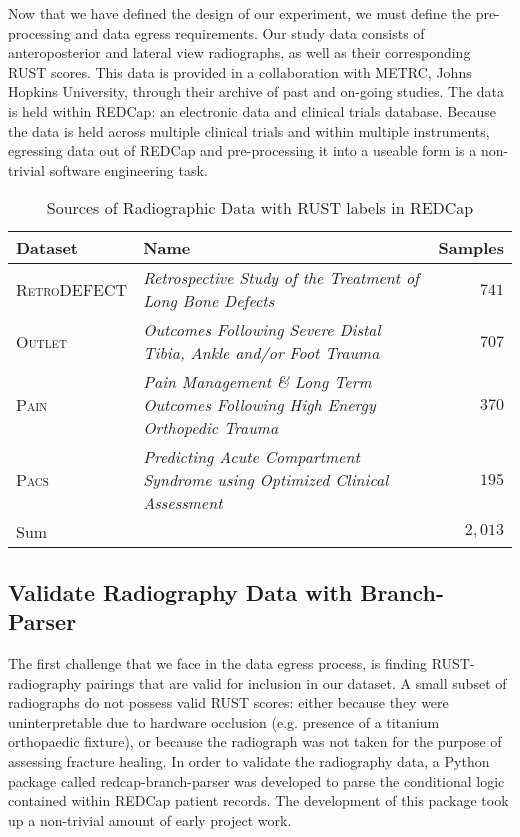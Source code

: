 Now that we have defined the design of our experiment, we must define the pre-processing and data egress requirements.
Our study data consists of anteroposterior and lateral view radiographs, as well as their corresponding RUST scores. This data is provided in a collaboration with METRC, Johns Hopkins University, through their archive of past and on-going studies. \autocites{RetroDEFECT2022}{OUTLET2021}{PAIN2017}{PACS2022} The data is held within REDCap: an electronic data and clinical trials database. \autocite{redcap} Because the data is held across multiple clinical trials and within multiple instruments, egressing data out of REDCap and pre-processing it into a useable form is a non-trivial software engineering task.

\begin{table}[H]
    \centering
    \begin{tabularx}{\textwidth}{@{}lXr@{}}
    \toprule
    \textbf{Dataset}     & \textbf{Name} & \textbf{Samples} \\ \midrule
    \autocite{RetroDEFECT2022} \textsc{RetroDEFECT} & \emph{Retrospective Study of the Treatment of Long Bone Defects}    & $741$             \\
    \autocite{OUTLET2021} \textsc{Outlet}      & \emph{Outcomes Following Severe Distal Tibia, Ankle and/or Foot Trauma}     & $707$             \\
    \autocite{PAIN2017} \textsc{Pain}        & \emph{Pain Management \& Long Term Outcomes Following High Energy Orthopedic Trauma}      & $370$             \\
    \autocite{PACS2022} \textsc{Pacs}        & \emph{Predicting Acute Compartment Syndrome using Optimized Clinical Assessment}    & $195$             \\ \midrule
    Sum         &      & $2,013$            \\ \bottomrule
    \end{tabularx}%
    \caption{Sources of Radiographic Data with RUST labels in REDCap}\label{tab:datasets}
\end{table}

\subsection{Validate Radiography Data with Branch-Parser}

The first challenge that we face in the data egress process, is finding RUST-radiography pairings that are valid for inclusion in our dataset. A small subset of radiographs do not possess valid RUST scores: either because they were uninterpretable due to hardware occlusion (e.g. presence of a titanium orthopaedic fixture), or because the radiograph was not taken for the purpose of assessing fracture healing. In order to validate the radiography data, a Python package called redcap-branch-parser was developed to parse the conditional logic contained within REDCap patient records. \autocite{redcap-branch-parser} The development of this package took up a non-trivial amount of early project work.

